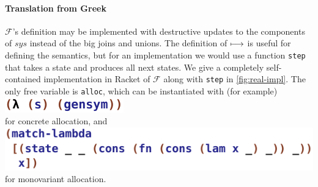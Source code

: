 \paragraph{Translation from Greek}
 ${\mathcal F}$'s definition may be implemented with destructive updates to the components of $\mathit{sys}$ instead of the big joins and unions.
%
 The definition of $\longmapsto$ is useful for defining the semantics, but for an implementation we would use a
 function \texttt{step} that takes a state and produces all next states.
%
 We give a completely self-contained implementation in Racket of ${\mathcal F}$ along with \texttt{step} in \autoref{fig:real-impl}.
%
 The only free variable is \texttt{alloc}, which can be instantiated with (for example)
\\[2pt]
 \includegraphics{calloc}
\\
 for concrete allocation, and
\\[2pt]
 \includegraphics{malloc}
\\
 for monovariant allocation.
%
\\[2pt]
